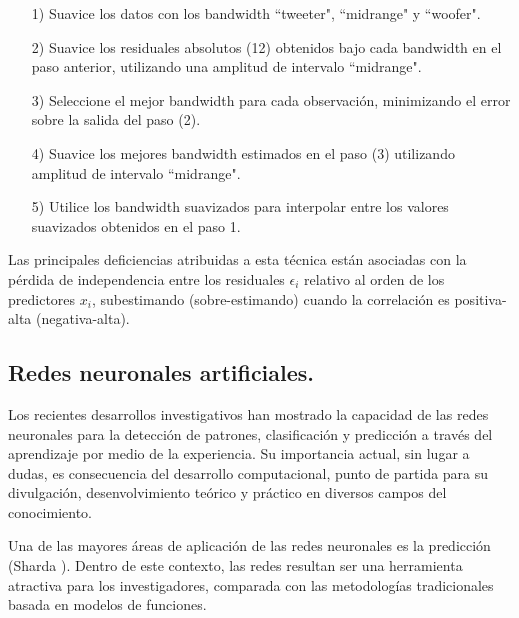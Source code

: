 \begin{itemize}
  \item[1)] Suavice los datos con los bandwidth ``tweeter"\hspace*{0.01 cm}, ``midrange"\hspace*{0.01 cm} y ``woofer"\hspace*{0.01 cm}.
  \item[2)] Suavice los residuales absolutos (12) obtenidos bajo cada bandwidth en el paso anterior, utilizando una amplitud de intervalo ``midrange"\hspace*{0.01 cm}.
  \item[3)] Seleccione el mejor bandwidth para cada observaci\'on, minimizando el error sobre la salida del paso (2).
  \item[4)] Suavice los mejores bandwidth estimados en el paso (3) utilizando amplitud de intervalo ``midrange"\hspace*{0.01 cm}.
  \item[5)] Utilice los bandwidth suavizados para interpolar entre los valores suavizados obtenidos en el paso 1.
\end{itemize}


\hspace*{0.4 cm} Las principales deficiencias atribuidas a esta t\'ecnica est\'an asociadas con la p\'erdida de independencia entre los residuales $\epsilon_{i}$ relativo al orden de los predictores $x_{i}$, subestimando (sobre-estimando) cuando la correlaci\'on es positiva-alta (negativa-alta).

\subsection{Redes neuronales artificiales.\\}


\hspace*{0.4 cm} Los recientes desarrollos investigativos han mostrado la capacidad de las redes neuronales para la detecci\'on de patrones, clasificaci\'on y predicci\'on a trav\'es del aprendizaje por medio de la experiencia. Su importancia actual, sin lugar a dudas, es consecuencia del desarrollo computacional, punto de partida para su divulgaci\'on, desenvolvimiento te\'orico y pr\'actico en diversos campos del conocimiento.

\hspace*{0.4 cm} Una de las mayores \'areas de aplicaci\'on de las redes neuronales es la predicci\'on (Sharda \cite{SH}). Dentro de este contexto, las redes resultan ser una herramienta atractiva para los investigadores, comparada con las metodolog\'ias tradicionales basada en modelos de funciones.

